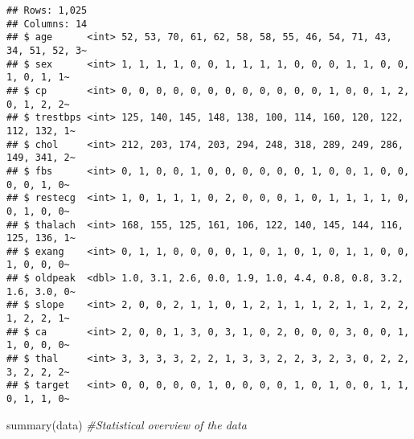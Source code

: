 \documentclass[
]{article}
\newenvironment{Shaded}{\begin{snugshade}}{\end{snugshade}}
\newcommand{\CommentTok}[1]{\textcolor[rgb]{0.56,0.35,0.01}{\textit{#1}}}
\newcommand{\FunctionTok}[1]{\textcolor[rgb]{0.00,0.00,0.00}{#1}}
\newcommand{\NormalTok}[1]{#1}
\begin{document}
\begin{verbatim}
## Rows: 1,025
## Columns: 14
## $ age      <int> 52, 53, 70, 61, 62, 58, 58, 55, 46, 54, 71, 43, 34, 51, 52, 3~
## $ sex      <int> 1, 1, 1, 1, 0, 0, 1, 1, 1, 1, 0, 0, 0, 1, 1, 0, 0, 1, 0, 1, 1~
## $ cp       <int> 0, 0, 0, 0, 0, 0, 0, 0, 0, 0, 0, 0, 1, 0, 0, 1, 2, 0, 1, 2, 2~
## $ trestbps <int> 125, 140, 145, 148, 138, 100, 114, 160, 120, 122, 112, 132, 1~
## $ chol     <int> 212, 203, 174, 203, 294, 248, 318, 289, 249, 286, 149, 341, 2~
## $ fbs      <int> 0, 1, 0, 0, 1, 0, 0, 0, 0, 0, 0, 1, 0, 0, 1, 0, 0, 0, 0, 1, 0~
## $ restecg  <int> 1, 0, 1, 1, 1, 0, 2, 0, 0, 0, 1, 0, 1, 1, 1, 1, 0, 0, 1, 0, 0~
## $ thalach  <int> 168, 155, 125, 161, 106, 122, 140, 145, 144, 116, 125, 136, 1~
## $ exang    <int> 0, 1, 1, 0, 0, 0, 0, 1, 0, 1, 0, 1, 0, 1, 1, 0, 0, 1, 0, 0, 0~
## $ oldpeak  <dbl> 1.0, 3.1, 2.6, 0.0, 1.9, 1.0, 4.4, 0.8, 0.8, 3.2, 1.6, 3.0, 0~
## $ slope    <int> 2, 0, 0, 2, 1, 1, 0, 1, 2, 1, 1, 1, 2, 1, 1, 2, 2, 1, 2, 2, 1~
## $ ca       <int> 2, 0, 0, 1, 3, 0, 3, 1, 0, 2, 0, 0, 0, 3, 0, 0, 1, 1, 0, 0, 0~
## $ thal     <int> 3, 3, 3, 3, 2, 2, 1, 3, 3, 2, 2, 3, 2, 3, 0, 2, 2, 3, 2, 2, 2~
## $ target   <int> 0, 0, 0, 0, 0, 1, 0, 0, 0, 0, 1, 0, 1, 0, 0, 1, 1, 0, 1, 1, 0~
\end{verbatim}

\begin{Shaded}
\begin{Highlighting}[]
\FunctionTok{summary}\NormalTok{(data) }\CommentTok{\#Statistical overview of the data}
\end{Highlighting}
\end{Shaded}
\end{document}
